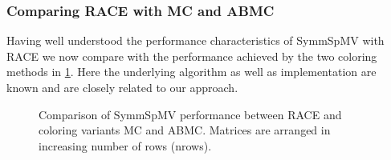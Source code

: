 \subsubsection{Comparing \acrshort{RACE} with \acrshort{MC} and \acrshort{ABMC}}
%
Having well understood the performance characteristics of  \acrshort{SymmSpMV} with \acrshort{RACE} we now compare with the performance achieved by the two coloring methods in \cref{fig:symm_spmv}. Here the underlying algorithm as well as implementation are known and are closely related to our approach. 
%
\begin{figure}[thbp]
	\centering
	\hspace{1em}
	\caption{Comparison of \acrshort{SymmSpMV} performance between \acrshort{RACE} and coloring variants \acrshort{MC} and \acrshort{ABMC}. Matrices are arranged in increasing number of rows (\acrshort{nrows}).}
	\label{fig:symm_spmv}
\end{figure}

